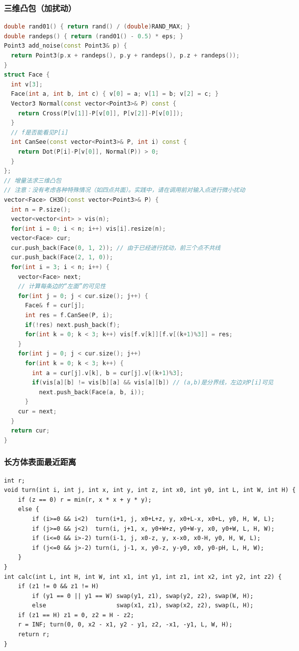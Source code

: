 \documentclass[landscape,a4paper]{article}
\begin{document}
\begin{spacing}{0.3}
\begin{multicols}{3}
\subsubsection{三维凸包（加扰动）}
\begin{lstlisting}[language=C++]
double rand01() { return rand() / (double)RAND_MAX; }
double randeps() { return (rand01() - 0.5) * eps; }
Point3 add_noise(const Point3& p) {
  return Point3(p.x + randeps(), p.y + randeps(), p.z + randeps());
}
struct Face {
  int v[3];
  Face(int a, int b, int c) { v[0] = a; v[1] = b; v[2] = c; }
  Vector3 Normal(const vector<Point3>& P) const {
    return Cross(P[v[1]]-P[v[0]], P[v[2]]-P[v[0]]);
  }
  // f是否能看见P[i]
  int CanSee(const vector<Point3>& P, int i) const {
    return Dot(P[i]-P[v[0]], Normal(P)) > 0;
  }
};
// 增量法求三维凸包
// 注意：没有考虑各种特殊情况（如四点共面）。实践中，请在调用前对输入点进行微小扰动
vector<Face> CH3D(const vector<Point3>& P) {
  int n = P.size();
  vector<vector<int> > vis(n);
  for(int i = 0; i < n; i++) vis[i].resize(n);
  vector<Face> cur;
  cur.push_back(Face(0, 1, 2)); // 由于已经进行扰动，前三个点不共线
  cur.push_back(Face(2, 1, 0));
  for(int i = 3; i < n; i++) {
    vector<Face> next;
    // 计算每条边的“左面”的可见性
    for(int j = 0; j < cur.size(); j++) {
      Face& f = cur[j];
      int res = f.CanSee(P, i);
      if(!res) next.push_back(f);
      for(int k = 0; k < 3; k++) vis[f.v[k]][f.v[(k+1)%3]] = res;
    }
    for(int j = 0; j < cur.size(); j++)
      for(int k = 0; k < 3; k++) {
        int a = cur[j].v[k], b = cur[j].v[(k+1)%3];
        if(vis[a][b] != vis[b][a] && vis[a][b]) // (a,b)是分界线，左边对P[i]可见
          next.push_back(Face(a, b, i));
      }
    cur = next;
  }
  return cur;
}
\end{lstlisting}

\subsubsection{长方体表面最近距离}
\begin{lstlisting}
int r;
void turn(int i, int j, int x, int y, int z, int x0, int y0, int L, int W, int H) {
	if (z == 0) r = min(r, x * x + y * y);
	else {
		if (i>=0 && i<2)  turn(i+1, j, x0+L+z, y, x0+L-x, x0+L, y0, H, W, L);
		if (j>=0 && j<2)  turn(i, j+1, x, y0+W+z, y0+W-y, x0, y0+W, L, H, W);
		if (i<=0 && i>-2) turn(i-1, j, x0-z, y, x-x0, x0-H, y0, H, W, L);
		if (j<=0 && j>-2) turn(i, j-1, x, y0-z, y-y0, x0, y0-pH, L, H, W);
	}
}
int calc(int L, int H, int W, int x1, int y1, int z1, int x2, int y2, int z2) {
	if (z1 != 0 && z1 != H)
		if (y1 == 0 || y1 == W) swap(y1, z1), swap(y2, z2), swap(W, H);
		else                    swap(x1, z1), swap(x2, z2), swap(L, H);
	if (z1 == H) z1 = 0, z2 = H - z2;
	r = INF; turn(0, 0, x2 - x1, y2 - y1, z2, -x1, -y1, L, W, H);
	return r;
}
\end{lstlisting}


\end{multicols}
\end{spacing}
\end{document}
